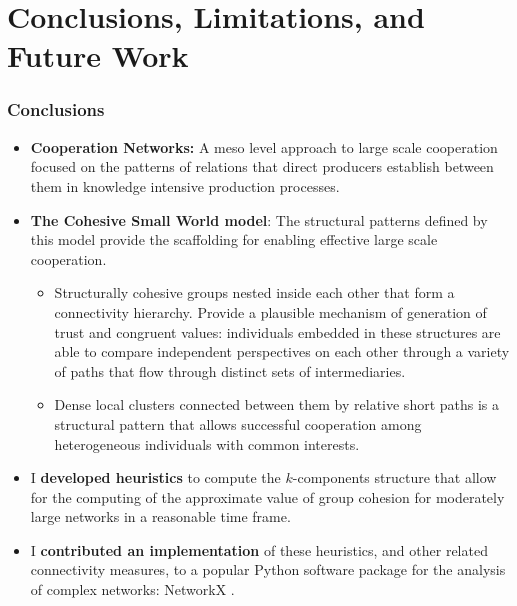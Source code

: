 \documentclass[ignorenonframetext,red,8pt,notes=hide]{beamer}
\begin{document}
\section{Conclusions, Limitations, and Future Work}


\begin{frame}
\frametitle{Conclusions}

\begin{itemize}

\item \textbf{Cooperation Networks:} A meso level approach to large scale cooperation focused on the patterns of relations that direct producers establish between them in knowledge intensive production processes.

\item \textbf{The Cohesive Small World model}: The structural patterns defined by this model provide the scaffolding for enabling effective large scale cooperation.

\begin{itemize}
\item Structurally cohesive groups nested inside each other that form a connectivity hierarchy. Provide a plausible mechanism of generation of trust and congruent values: individuals embedded in these structures are able to compare independent perspectives on each other through a variety of paths that flow through distinct sets of intermediaries.


\item Dense local clusters connected between them by relative short paths is a structural pattern that allows successful cooperation among heterogeneous individuals with common interests. 
\end{itemize}

\item I \textbf{developed heuristics} to compute the $k$-components structure that allow for the computing of the approximate value of group cohesion for moderately large networks in a reasonable time frame.

\item I \textbf{contributed an implementation} of these heuristics, and other related connectivity measures, to a popular Python software package for the analysis of complex networks: NetworkX \citep{hagberg:2008}.

\end{itemize}

\end{frame}
\end{document}
